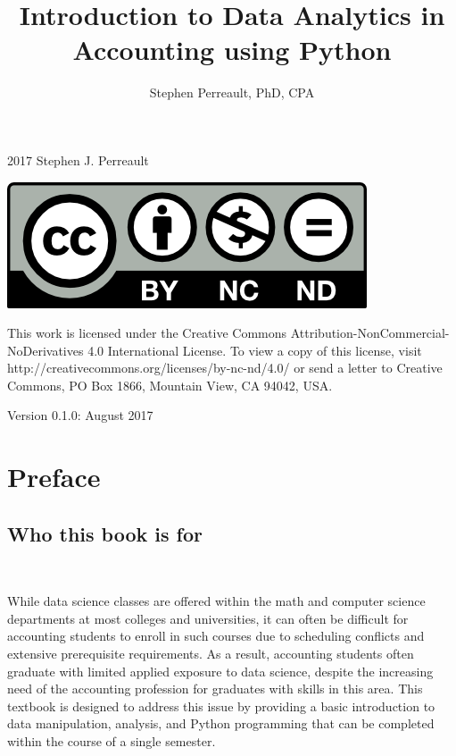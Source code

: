 \documentclass{book}
\begin{document}
\frontmatter
\pagestyle{plain}
\begin{titlepage}
	\title {\huge \textbf{Introduction to Data Analytics in Accounting using Python }}
	\date{}
	\author{Stephen Perreault, PhD, CPA}
	\maketitle
\end{titlepage}
\begingroup
	\parindent 0pt
	\parskip \baselineskip 
	\textcopyright{} 2017 Stephen J. Perreault 
	
	\begin {center}
	\includegraphics  [scale=1.5]{creative_commons_license}
	\end {center}
	
	This work is licensed under the Creative Commons Attribution-NonCommercial-NoDerivatives 4.0 International License. To view a copy of this license, visit http://creativecommons.org/licenses/by-nc-nd/4.0/ or send a letter to Creative Commons, PO Box 1866, Mountain View, CA 94042, USA.
	
	Version 0.1.0: August 2017
\endgroup
\tableofcontents


\mainmatter	
\parindent 0pt
\parskip \baselineskip 

\chapter{Preface}
\section{Who this book is for}\

 While data science classes are offered within the math and computer science departments at most colleges and universities, it can often be difficult for accounting students to enroll in such courses due to scheduling conflicts and extensive prerequisite requirements. As a result, accounting students often graduate with limited applied exposure to data science, despite the increasing need of the accounting profession for graduates with skills in this area. This textbook is designed to address this issue by providing a basic introduction to data manipulation, analysis, and Python programming that can be completed within the course of a single semester. 
\end{document}
